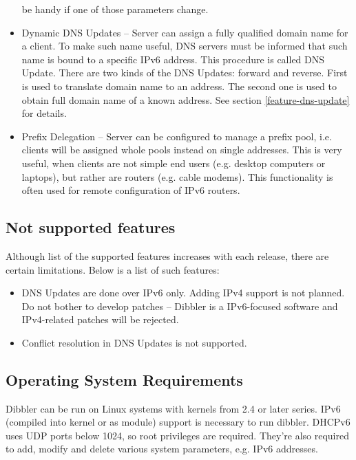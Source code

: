 \begin{itemize}
      be handy if one of those parameters change. \cite{rfc4242}
\item Dynamic DNS Updates -- Server can assign a fully qualified
      domain name for a client. To make such name useful, DNS servers
      must be informed that such name is bound to a specific IPv6
      address. This procedure is called DNS Update. There are two kinds
      of the DNS Updates: forward and reverse. First is used to
      translate domain name to an address. The second one is used to
      obtain full domain name of a known address. See section
      \ref{feature-dns-update} for details. \cite{rfc4704}
\item Prefix Delegation -- Server can be configured to manage a prefix
      pool, i.e. clients will be assigned whole pools instead on
      single addresses. This is very useful, when clients are not
      simple end users (e.g. desktop computers or laptops), but rather
      are routers (e.g. cable modems). This functionality is often
      used for remote configuration of IPv6 routers. \cite{rfc3633}
\end{itemize}

\subsection{Not supported features}
Although list of the supported features increases with each release,
there are certain limitations. Below is a list of such
features:

\begin{itemize}
\item DNS Updates are done over IPv6 only. Adding IPv4 support is
   not planned. Do not bother to develop patches -- Dibbler is a
   IPv6-focused software and IPv4-related patches will be rejected.
\item Conflict resolution in DNS Updates is not supported.
\end{itemize}

\subsection{Operating System Requirements}
\label{requirements}
Dibbler can be run on Linux systems with kernels from 2.4 or later
series. IPv6 (compiled into kernel or as module) support is necessary
to run dibbler. DHCPv6 uses UDP ports below 1024, so root privileges
are required. They're also required to add, modify and delete various
system parameters, e.g. IPv6 addresses.


